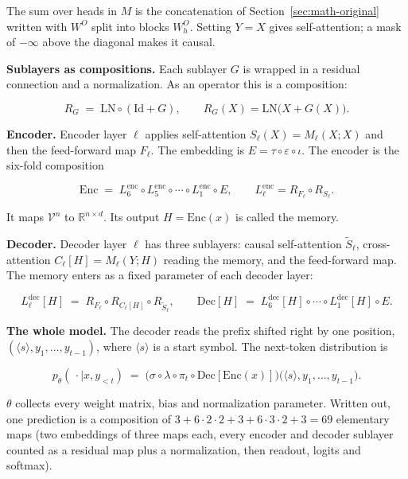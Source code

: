 The sum over heads in \(M\) is the concatenation of Section~\ref{sec:math-original} written with
\(W^O\) split into blocks \(W_h^O\). Setting \(Y = X\) gives self-attention;
a mask of \(-\infty\) above the diagonal makes it causal.

\textbf{Sublayers as compositions.} Each sublayer \(G\) is wrapped in a
residual connection and a normalization. As an operator this is a
composition:

\[
R_G \;=\; \mathrm{LN}\circ(\mathrm{Id} + G), \qquad R_G(X) = \mathrm{LN}\big(X + G(X)\big).
\]

\textbf{Encoder.} Encoder layer \(\ell\) applies self-attention
\(S_\ell(X) = M_\ell(X; X)\) and then the feed-forward map
\(F_\ell\). The embedding is \(E = \tau\circ\varepsilon\circ\iota\). The encoder is the six-fold
composition

\[
\mathrm{Enc} \;=\; L^{\mathrm{enc}}_6\circ L^{\mathrm{enc}}_5\circ\cdots\circ L^{\mathrm{enc}}_1\circ E, \qquad L^{\mathrm{enc}}_\ell = R_{F_\ell}\circ R_{S_\ell}.
\]

It maps \(\mathcal{V}^{n}\) to \(\mathbb{R}^{n\times d}\). Its output \(H
= \mathrm{Enc}(x)\) is called the memory.

\textbf{Decoder.} Decoder layer \(\ell\) has three sublayers: causal
self-attention \(\tilde{S}_\ell\), cross-attention \(C_\ell[H] =
M_\ell(Y; H)\) reading the memory, and the feed-forward map. The
memory enters as a fixed parameter of each decoder layer:

\[
L^{\mathrm{dec}}_\ell[H] \;=\; R_{F_\ell}\circ R_{C_\ell[H]}\circ R_{\tilde S_\ell}, \qquad \mathrm{Dec}[H] \;=\; L^{\mathrm{dec}}_6[H]\circ\cdots\circ L^{\mathrm{dec}}_1[H]\circ E .
\]

\textbf{The whole model.} The decoder reads the prefix shifted right by
one position, \((\langle s\rangle, y_{1}, \ldots, y_{t-1})\), where \(\langle s\rangle\) is a start
symbol. The next-token distribution is

\[
p_\theta(\,\cdot \mid x, y_{<t}) \;=\; \big(\sigma\circ\lambda\circ\pi_t\circ \mathrm{Dec}[\mathrm{Enc}(x)]\big)\big(\langle s\rangle, y_1,\dots,y_{t-1}\big).
\]

\(\theta\) collects every weight matrix, bias and normalization parameter.
Written out, one prediction is a composition of \(3 + 6\cdot 2\cdot 2 + 3 + 6\cdot 3\cdot 2 +
3 = 69\) elementary maps (two embeddings of three maps each, every encoder
and decoder sublayer counted as a residual map plus a normalization,
then readout, logits and softmax).

